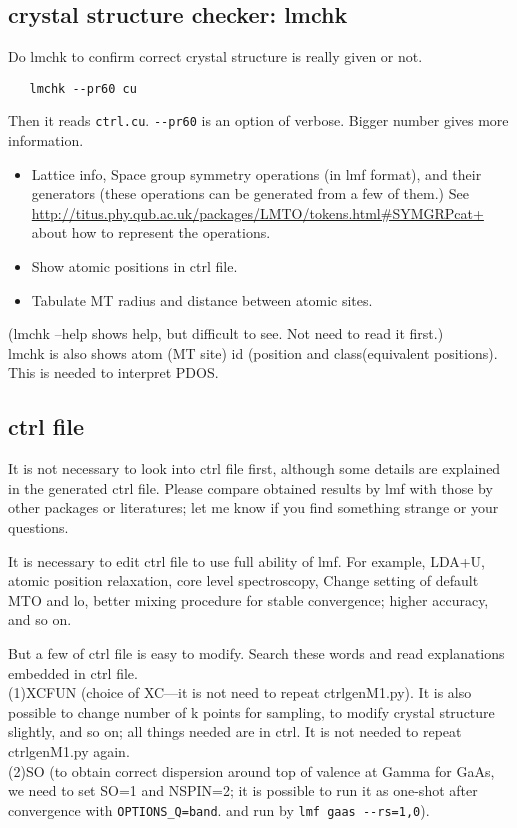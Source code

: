 \documentclass[a4paper,10pt,epsf,fleqn]{article}
\begin{document}
\subsection{crystal structure checker: lmchk}
Do lmchk to confirm correct crystal structure is really given or not.
\begin{verbatim}
   lmchk --pr60 cu 
\end{verbatim}
Then it reads \verb+ctrl.cu+. \verb+--pr60+ is an option of verbose. Bigger number gives more information.
\begin{itemize}
\item Lattice info, Space group symmetry operations (in lmf format), and
      their generators (these operations can be generated from a few of them.)
      See \url{http://titus.phy.qub.ac.uk/packages/LMTO/tokens.html#SYMGRPcat+}
      about how to represent the operations.
\item Show atomic positions in ctrl file. 
\item Tabulate MT radius and distance between atomic sites.
\end{itemize}
(lmchk --help shows help, but difficult to see. Not need to read it first.)\\

lmchk is also shows atom (MT site) id (position and class(equivalent
positions). This is needed to interpret PDOS.

\subsection{ctrl file}
It is not necessary to look into ctrl file first, 
although some details are explained in the generated ctrl file.
Please compare obtained results by lmf with those by other packages or literatures; 
let me know if you find something strange or your questions.

It is necessary to edit ctrl file to use full ability of lmf.
For example, LDA+U, atomic position relaxation, core level
spectroscopy, Change setting of default MTO and lo,
better mixing procedure for stable convergence; higher accuracy, and so on. 

But a few of ctrl file is easy to modify. Search these words and read 
explanations embedded in ctrl file.\\
(1)XCFUN (choice of XC---it is not need to repeat ctrlgenM1.py). 
It is also possible to change number of k points for sampling, to modify
crystal structure slightly, and so on; all things needed are in ctrl.
It is not needed to repeat ctrlgenM1.py again.\\
(2)SO (to obtain correct dispersion around top of valence at 
Gamma for GaAs, we need to set SO=1 and NSPIN=2; 
it is possible to run it as one-shot after convergence with
\verb+OPTIONS_Q=band+. and run by \verb+lmf gaas --rs=1,0+).\\
\end{document}

